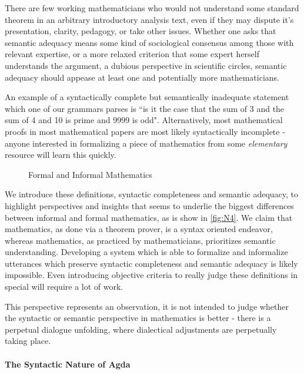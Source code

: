 There are few working mathematicians who would not understand some standard
theorem in an arbitrary introductory analysis text, even if they may dispute
it's presentation, clarity, pedagogy, or take other issues. Whether one asks
that semantic adequacy means some kind of sociological consensus among those
with relevant expertise, or a more relaxed criterion that some expert herself
understands the argument, a dubious perspective in scientific circles, semantic
adequacy should appease at least one and potentially more mathematicians.

An example of a syntactically complete but semantically inadequate statement
which one of our grammars parses is ``is it the case that the sum of 3 and the
sum of 4 and 10 is prime and 9999 is odd". Alternatively, most mathematical
proofs in most mathematical papers are most likely syntactically incomplete -
anyone interested in formalizing a piece of mathematics from some
\emph{elementary} resource will learn this quickly.

\begin{figure}[H]
\centering
{}
\caption{Formal and Informal Mathematics} \label{fig:N4}
\end{figure}

We introduce these definitions, syntactic completeness and semantic adequacy, to
highlight perspectives and insights that seems to underlie the biggest
differences between informal and formal mathematics, as is show in
\autoref{fig:N4}. We claim that mathematics, as done via a theorem prover, is a
syntax oriented endeavor, whereas mathematics, as practiced by mathematicians,
prioritizes semantic understanding. Developing a system which is able to
formalize and informalize utterances which preserve syntactic completeness and
semantic adequacy is likely impossible. Even introducing objective criteria to
really judge these definitions in special will require a lot of work.

This perspective represents an observation, it is not intended to judge whether
the syntactic or semantic perspective in mathematics is better - there is a
perpetual dialogue unfolding, where dialectical adjustments are perpetually
taking place.

\paragraph{The Syntactic Nature of Agda}

